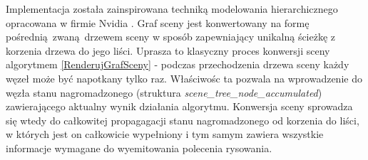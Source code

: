 Implementacja została zainspirowana techniką modelowania hierarchicznego opracowana w firmie Nvidia \cite{ADVANCEDSCENEGRAPH}.
Graf sceny jest konwertowany na formę pośrednią zwaną drzewem sceny w sposób zapewniający unikalną ścieżkę z korzenia drzewa do jego liści.
Uprasza to klasyczny proces konwersji sceny algorytmem \ref{RenderujGrafSceny} - podczas przechodzenia drzewa sceny każdy węzeł może być napotkany tylko raz.
Właściwośc ta pozwala na wprowadzenie do węzła stanu nagromadzonego (struktura \textit{scene\_tree\_node\_accumulated}) zawierającego aktualny wynik działania algorytmu.
Konwersja sceny sprowadza się wtedy do całkowitej propagagacji stanu nagromadzonego od korzenia do liści, w których jest on całkowicie wypełniony i tym samym zawiera wszystkie informacje wymagane do wyemitowania polecenia rysowania.

